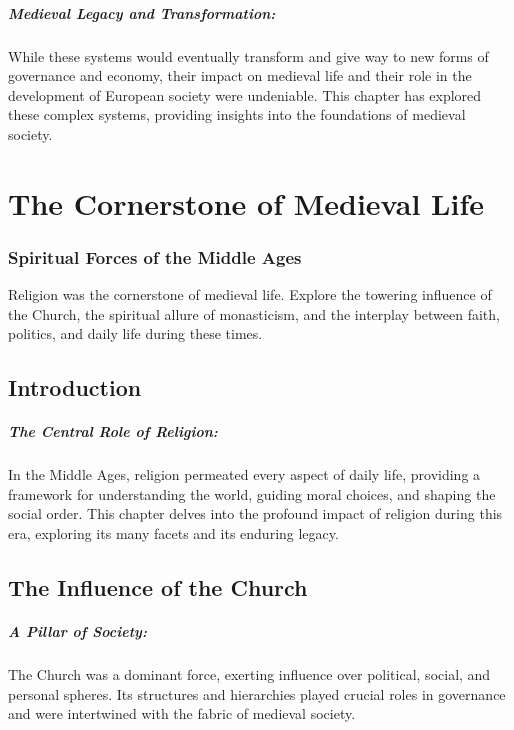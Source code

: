\documentclass[a4paper,12pt]{book}
\begin{document}
\paragraph{Medieval Legacy and Transformation:}
While these systems would eventually transform and give way to new forms of governance and economy, their impact on medieval life and their role in the development of European society were undeniable. This chapter has explored these complex systems, providing insights into the foundations of medieval society.

\chapter{The Cornerstone of Medieval Life}
\subsection*{Spiritual Forces of the Middle Ages}
Religion was the cornerstone of medieval life. Explore the towering influence of the Church, the spiritual allure of monasticism, and the interplay between faith, politics, and daily life during these times.

\section*{Introduction}

\paragraph{The Central Role of Religion:}
In the Middle Ages, religion permeated every aspect of daily life, providing a framework for understanding the world, guiding moral choices, and shaping the social order. This chapter delves into the profound impact of religion during this era, exploring its many facets and its enduring legacy.

\section*{The Influence of the Church}

\paragraph{A Pillar of Society:}
The Church was a dominant force, exerting influence over political, social, and personal spheres. Its structures and hierarchies played crucial roles in governance and were intertwined with the fabric of medieval society.
\end{document}
